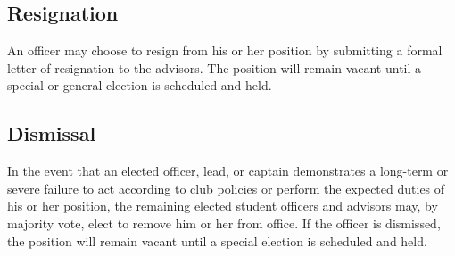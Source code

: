 \subsection{Resignation}
An officer may choose to resign from his or her position by submitting a formal letter of resignation to the advisors. The position will remain vacant until a special or general election is scheduled and held.

\subsection{Dismissal}
In the event that an elected officer, lead, or captain demonstrates a long-term or severe failure to act according to club policies or perform the expected duties of his or her position, the remaining elected student officers and advisors may, by majority vote, elect to remove him or her from office. If the officer is dismissed, the position will remain vacant until a special election is scheduled and held.